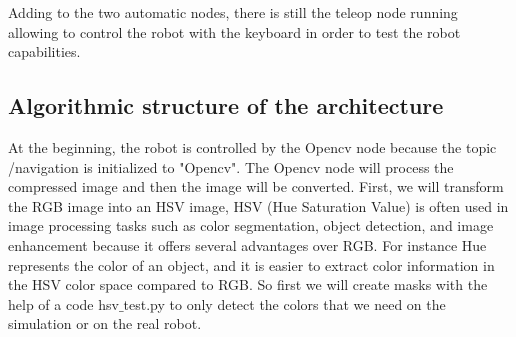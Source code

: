 \documentclass[conference]{IEEEtran}
\begin{document}
Adding to the two automatic nodes, there is still the teleop node running allowing to control the robot with the keyboard in order to test the robot capabilities.
%
%

\subsection{Algorithmic structure of the architecture}
At the beginning, the robot is controlled by the Opencv node because the topic /navigation is initialized to "Opencv".
The Opencv node will process the compressed image and then the image will be converted. First, we will transform the RGB image into an HSV image, HSV (Hue Saturation Value) is often used in image processing tasks such as color segmentation, object detection, and image enhancement because it offers several advantages over RGB. For instance Hue represents the color of an object, and it is easier to extract color information in the HSV color space compared to RGB. So first we will create masks with the help of a code hsv$\_$test.py to only detect the colors that we need on the simulation or on the real robot. \\
\end{document}
